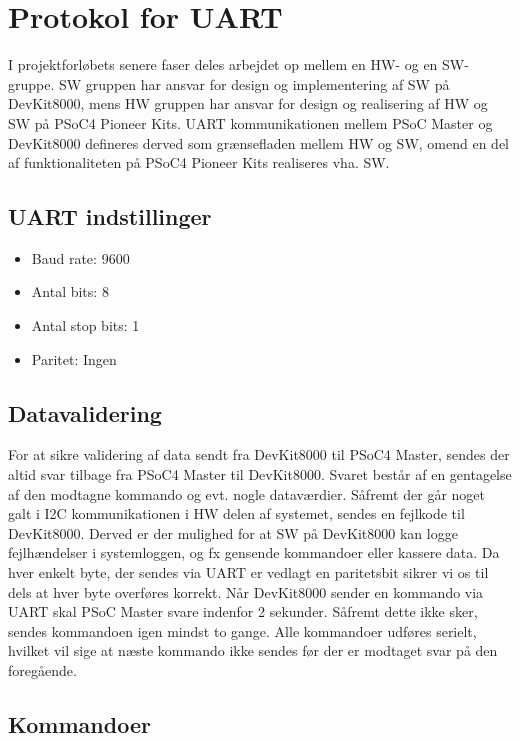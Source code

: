 \clearpage
\section{Protokol for UART} \label{sec:UART_protokol}

I projektforløbets senere faser deles arbejdet op mellem en HW- og en SW-gruppe. SW gruppen har ansvar for design og implementering af SW på DevKit8000, mens HW gruppen har ansvar for design og realisering af HW og SW på PSoC4 Pioneer Kits. UART kommunikationen mellem PSoC Master og DevKit8000 defineres derved som grænsefladen mellem HW og SW, omend en del af funktionaliteten på PSoC4 Pioneer Kits realiseres vha. SW.

\subsection{UART indstillinger}

\begin{itemize}
\item Baud rate: 9600 
\item Antal bits: 8
\item Antal stop bits: 1
\item Paritet: Ingen
\end{itemize}

\subsection{Datavalidering}

For at sikre validering af data sendt fra DevKit8000 til PSoC4 Master, sendes der altid svar tilbage fra PSoC4 Master til DevKit8000. Svaret består af en gentagelse af den modtagne kommando og evt. nogle dataværdier. \newline
Såfremt der går noget galt i I2C kommunikationen i HW delen af systemet, sendes en fejlkode til DevKit8000. 
Derved er der mulighed for at SW på DevKit8000 kan logge fejlhændelser i systemloggen, og fx gensende kommandoer eller kassere data. \newline
Da hver enkelt byte, der sendes via UART er vedlagt en paritetsbit sikrer vi os til dels at hver byte overføres korrekt. \newline
Når DevKit8000 sender en kommando via UART skal PSoC Master svare indenfor 2 sekunder. Såfremt dette ikke sker, sendes kommandoen igen mindst to gange. Alle kommandoer udføres serielt, hvilket vil sige at næste kommando ikke sendes før der er modtaget svar på den foregående.

\subsection{Kommandoer}

